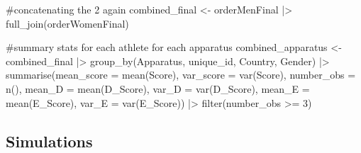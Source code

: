 \documentclass[
  letterpaper,
  DIV=11,
  numbers=noendperiod]{scrartcl}
\newenvironment{Shaded}{\begin{snugshade}}{\end{snugshade}}
\newcommand{\AttributeTok}[1]{\textcolor[rgb]{0.40,0.45,0.13}{#1}}
\newcommand{\CommentTok}[1]{\textcolor[rgb]{0.37,0.37,0.37}{#1}}
\newcommand{\DecValTok}[1]{\textcolor[rgb]{0.68,0.00,0.00}{#1}}
\newcommand{\FunctionTok}[1]{\textcolor[rgb]{0.28,0.35,0.67}{#1}}
\newcommand{\NormalTok}[1]{\textcolor[rgb]{0.00,0.23,0.31}{#1}}
\newcommand{\OtherTok}[1]{\textcolor[rgb]{0.00,0.23,0.31}{#1}}
\newcommand{\SpecialCharTok}[1]{\textcolor[rgb]{0.37,0.37,0.37}{#1}}
\begin{document}
\begin{Shaded}
\begin{Highlighting}[]
\CommentTok{\#concatenating the 2 again}
\NormalTok{combined\_final }\OtherTok{\textless{}{-}}\NormalTok{ orderMenFinal }\SpecialCharTok{|\textgreater{}}
  \FunctionTok{full\_join}\NormalTok{(orderWomenFinal)}
\end{Highlighting}
\end{Shaded}

\begin{Shaded}
\begin{Highlighting}[]
\CommentTok{\#summary stats for each athlete for each apparatus}
\NormalTok{combined\_apparatus }\OtherTok{\textless{}{-}}\NormalTok{ combined\_final }\SpecialCharTok{|\textgreater{}}
  \FunctionTok{group\_by}\NormalTok{(Apparatus, unique\_id, Country, Gender) }\SpecialCharTok{|\textgreater{}}
  \FunctionTok{summarise}\NormalTok{(}\AttributeTok{mean\_score =} \FunctionTok{mean}\NormalTok{(Score),}
            \AttributeTok{var\_score =} \FunctionTok{var}\NormalTok{(Score),}
            \AttributeTok{number\_obs =} \FunctionTok{n}\NormalTok{(),}
            \AttributeTok{mean\_D =} \FunctionTok{mean}\NormalTok{(D\_Score),}
            \AttributeTok{var\_D =} \FunctionTok{var}\NormalTok{(D\_Score),}
            \AttributeTok{mean\_E =} \FunctionTok{mean}\NormalTok{(E\_Score),}
            \AttributeTok{var\_E =} \FunctionTok{var}\NormalTok{(E\_Score)) }\SpecialCharTok{|\textgreater{}}
  \FunctionTok{filter}\NormalTok{(number\_obs }\SpecialCharTok{\textgreater{}=} \DecValTok{3}\NormalTok{)}
\end{Highlighting}
\end{Shaded}

\hypertarget{simulations}{%
\subsection{Simulations}\label{simulations}}
\end{document}
